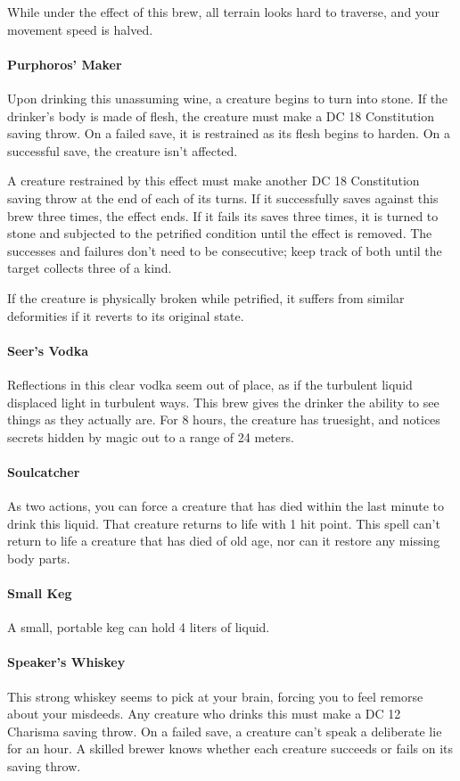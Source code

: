     While under the effect of this brew, all terrain looks hard to traverse, and your movement speed is halved.
\paragraph{Purphoros' Maker} %
    Upon drinking this unassuming wine, a creature begins to turn into stone.
    If the drinker's body is made of flesh, the creature must make a DC 18 Constitution saving throw.
    On a failed save, it is restrained as its flesh begins to harden.
    On a successful save, the creature isn't affected.

    A creature restrained by this effect must make another DC 18 Constitution saving throw at the end of each of its turns.
    If it successfully saves against this brew three times, the effect ends.
    If it fails its saves three times, it is turned to stone and subjected to the petrified condition until the effect is removed.
    The successes and failures don't need to be consecutive; keep track of both until the target collects three of a kind.

    If the creature is physically broken while petrified, it suffers from similar deformities if it reverts to its original state.
\paragraph{Seer's Vodka} %
    Reflections in this clear vodka seem out of place, as if the turbulent liquid displaced light in turbulent ways.
    This brew gives the drinker the ability to see things as they actually are.
    For 8 hours, the creature has truesight, and notices secrets hidden by magic out to a range of 24 meters.
\paragraph{Soulcatcher} %
    As two actions, you can force a creature that has died within the last minute to drink this liquid.
    That creature returns to life with 1 hit point.
    This spell can't return to life a creature that has died of old age, nor can it restore any missing body parts.
\paragraph{Small Keg}
    A small, portable keg can hold 4 liters of liquid.
\paragraph{Speaker's Whiskey} %
    This strong whiskey seems to pick at your brain, forcing you to feel remorse about your misdeeds.
    Any creature who drinks this must make a DC 12 Charisma saving throw.
    On a failed save, a creature can't speak a deliberate lie for an hour.
    A skilled brewer knows whether each creature succeeds or fails on its saving throw.

